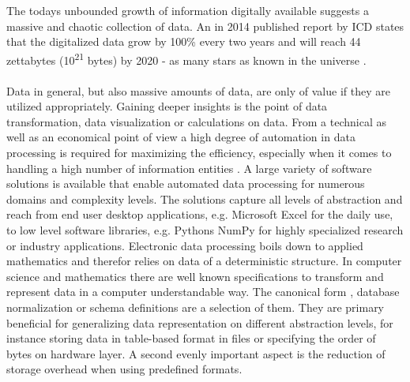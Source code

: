 The todays unbounded growth of information digitally available suggests a massive and chaotic collection of data. An in 2014 published report by ICD states that the digitalized data grow by 100\% every two years and will reach 44 zettabytes (10\textsuperscript{21} bytes) by 2020 - as many stars as known in the universe \cite{data_growth_2014}.
\\\\
Data in general, but also massive amounts of data, are only of value if they are utilized appropriately. Gaining deeper insights is the point of data transformation, data visualization or calculations on data. From a technical as well as an economical point of view a high degree of automation in data processing is required for maximizing the efficiency, especially when it comes to handling a high number of information entities \cite{labrinidis_jagadish_2012}. A large variety of software solutions is available that enable automated data processing for numerous domains and complexity levels. The solutions capture all levels of abstraction and reach from end user desktop applications, e.g. Microsoft Excel \cite{excel_2017} for the daily use, to low level software libraries, e.g. Pythons NumPy \cite{numpy_2017} for highly specialized research or industry applications. Electronic data processing boils down to applied mathematics and therefor relies on data of a deterministic structure. In computer science and mathematics there are well known specifications to transform and represent data in a computer understandable way. The canonical form \cite[p. 91 - 96]{dorst_doran_lasenby_2012}, database normalization \cite[p. 743]{halpin_tony_morgan_2010}or schema definitions \cite[p. 62]{halpin_tony_morgan_2010} are a selection of them. They are primary beneficial for generalizing data representation on different abstraction levels, for instance storing data in table-based format in files or specifying the order of bytes on hardware layer. A second evenly important aspect is the reduction of storage overhead when using predefined formats.
\\\\
